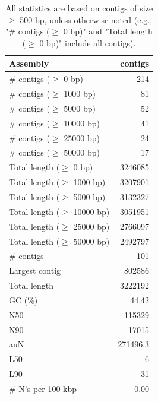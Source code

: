 \documentclass[12pt,a4paper]{article}
\begin{document}
\begin{table}[ht]
\begin{center}
\caption{All statistics are based on contigs of size $\geq$ 500 bp, unless otherwise noted (e.g., "\# contigs ($\geq$ 0 bp)" and "Total length ($\geq$ 0 bp)" include all contigs).}
\begin{tabular}{|l*{1}{|r}|}
\hline
Assembly & contigs \\ \hline
\# contigs ($\geq$ 0 bp) & 214 \\ \hline
\# contigs ($\geq$ 1000 bp) & 81 \\ \hline
\# contigs ($\geq$ 5000 bp) & 52 \\ \hline
\# contigs ($\geq$ 10000 bp) & 41 \\ \hline
\# contigs ($\geq$ 25000 bp) & 24 \\ \hline
\# contigs ($\geq$ 50000 bp) & 17 \\ \hline
Total length ($\geq$ 0 bp) & 3246085 \\ \hline
Total length ($\geq$ 1000 bp) & 3207901 \\ \hline
Total length ($\geq$ 5000 bp) & 3132327 \\ \hline
Total length ($\geq$ 10000 bp) & 3051951 \\ \hline
Total length ($\geq$ 25000 bp) & 2766097 \\ \hline
Total length ($\geq$ 50000 bp) & 2492797 \\ \hline
\# contigs & 101 \\ \hline
Largest contig & 802586 \\ \hline
Total length & 3222192 \\ \hline
GC (\%) & 44.42 \\ \hline
N50 & 115329 \\ \hline
N90 & 17015 \\ \hline
auN & 271496.3 \\ \hline
L50 & 6 \\ \hline
L90 & 31 \\ \hline
\# N's per 100 kbp & 0.00 \\ \hline
\end{tabular}
\end{center}
\end{table}
\end{document}
